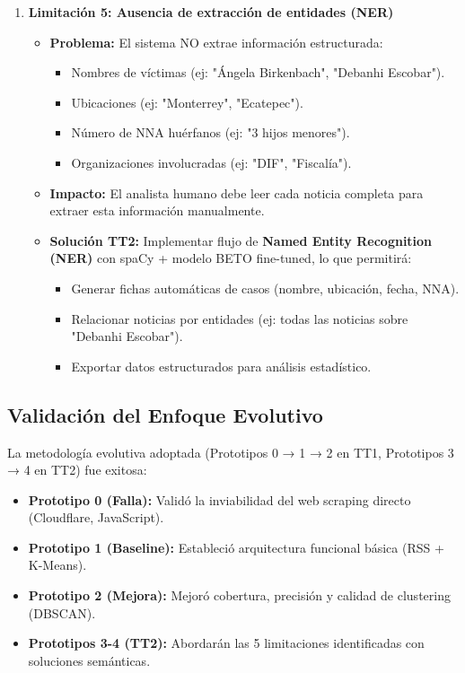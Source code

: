 \begin{enumerate}
    \item \textbf{Limitación 5: Ausencia de extracción de entidades (NER)}
    \begin{itemize}
        \item \textbf{Problema:} El sistema NO extrae información estructurada:
        \begin{itemize}
            \item Nombres de víctimas (ej: "Ángela Birkenbach", "Debanhi Escobar").
            \item Ubicaciones (ej: "Monterrey", "Ecatepec").
            \item Número de NNA huérfanos (ej: "3 hijos menores").
            \item Organizaciones involucradas (ej: "DIF", "Fiscalía").
        \end{itemize}
        \item \textbf{Impacto:} El analista humano debe leer cada noticia completa para extraer esta información manualmente.
        \item \textbf{Solución TT2:} Implementar flujo de \textbf{Named Entity Recognition (NER)} con spaCy + modelo BETO fine-tuned, lo que permitirá:
        \begin{itemize}
            \item Generar fichas automáticas de casos (nombre, ubicación, fecha, NNA).
            \item Relacionar noticias por entidades (ej: todas las noticias sobre "Debanhi Escobar").
            \item Exportar datos estructurados para análisis estadístico.
        \end{itemize}
    \end{itemize}
\end{enumerate}

\subsection{Validación del Enfoque Evolutivo}
\label{subsec:validacion_evolutiva}

La metodología evolutiva adoptada (Prototipos 0 → 1 → 2 en TT1, Prototipos 3 → 4 en TT2) fue exitosa:

\begin{itemize}
    \item \textbf{Prototipo 0 (Falla):} Validó la inviabilidad del web scraping directo (Cloudflare, JavaScript).
    \item \textbf{Prototipo 1 (Baseline):} Estableció arquitectura funcional básica (RSS + K-Means).
    \item \textbf{Prototipo 2 (Mejora):} Mejoró cobertura, precisión y calidad de clustering (DBSCAN).
    \item \textbf{Prototipos 3-4 (TT2):} Abordarán las 5 limitaciones identificadas con soluciones semánticas.
\end{itemize}

